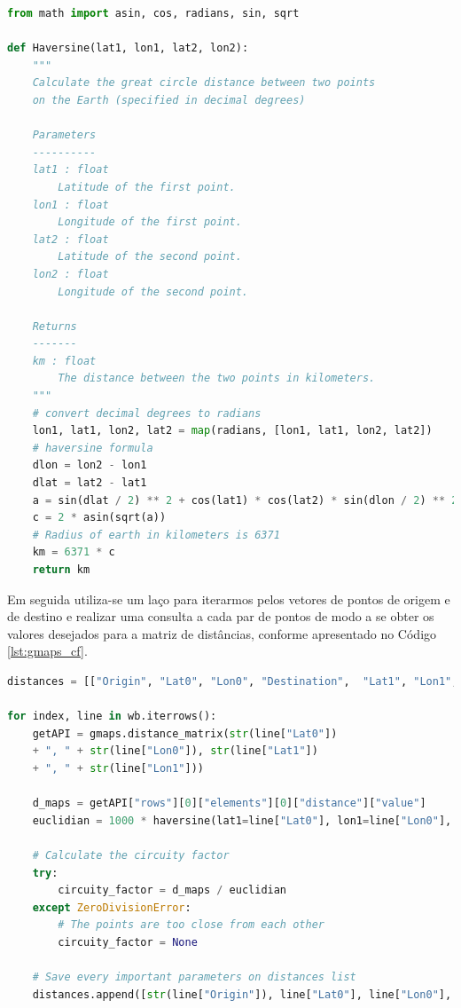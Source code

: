 \begin{lstlisting}[language=Python, label={lst:haversine},caption= \small Definindo a função \textit{haversine} \normalsize]
from math import asin, cos, radians, sin, sqrt

def Haversine(lat1, lon1, lat2, lon2):
    """
    Calculate the great circle distance between two points
    on the Earth (specified in decimal degrees)

    Parameters
    ----------
    lat1 : float
        Latitude of the first point.
    lon1 : float
        Longitude of the first point.
    lat2 : float
        Latitude of the second point.
    lon2 : float
        Longitude of the second point.

    Returns
    -------
    km : float
        The distance between the two points in kilometers.
    """
    # convert decimal degrees to radians
    lon1, lat1, lon2, lat2 = map(radians, [lon1, lat1, lon2, lat2])
    # haversine formula
    dlon = lon2 - lon1
    dlat = lat2 - lat1
    a = sin(dlat / 2) ** 2 + cos(lat1) * cos(lat2) * sin(dlon / 2) ** 2
    c = 2 * asin(sqrt(a))
    # Radius of earth in kilometers is 6371
    km = 6371 * c
    return km
\end{lstlisting}

Em seguida utiliza-se um laço para iterarmos pelos vetores de pontos de origem e de destino e realizar uma consulta a cada par de pontos de modo a se obter os valores desejados para a matriz de distâncias, conforme apresentado no Código \ref{lst:gmaps_cf}.

\begin{lstlisting}[language=Python, label={lst:gmaps_cf},caption= \small Consultando distâncias pelo \textit{Google Maps} e acumulando na matriz de distâncias \normalsize]
distances = [["Origin",	"Lat0",	"Lon0",	"Destination",	"Lat1",	"Lon1",	"Driving Distance (m)", "Euclidian Distance (m)", "CF"]]

for index, line in wb.iterrows():
    getAPI = gmaps.distance_matrix(str(line["Lat0"]) 
    + ", " + str(line["Lon0"]), str(line["Lat1"]) 
    + ", " + str(line["Lon1"]))
    
    d_maps = getAPI["rows"][0]["elements"][0]["distance"]["value"]
    euclidian = 1000 * haversine(lat1=line["Lat0"], lon1=line["Lon0"], lat2=line["Lat1"], lon2=line["Lon1"])
    
    # Calculate the circuity factor
    try:
        circuity_factor = d_maps / euclidian 
    except ZeroDivisionError:
        # The points are too close from each other
        circuity_factor = None 
        
    # Save every important parameters on distances list
    distances.append([str(line["Origin"]), line["Lat0"], line["Lon0"], line["Destination"], line["Lat1"], line["Lon1"], d_maps, euclidian, circuity_factor])
\end{lstlisting}

